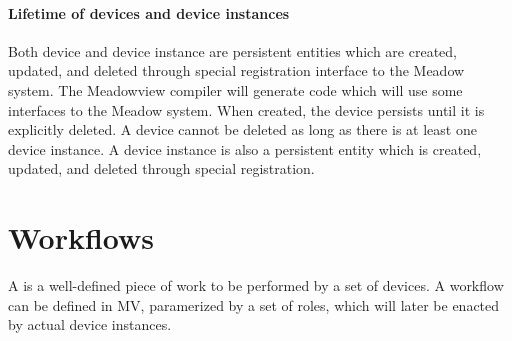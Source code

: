 \documentclass{myproc}
\begin{document}
\paragraph{Lifetime of devices and device instances}
Both device and device instance are persistent entities which are created,
updated, and deleted through special registration interface to the Meadow
system. The Meadowview compiler will generate code which will use some
interfaces to the Meadow system.
When created, the device persists until it is explicitly deleted. 
A device cannot be deleted as long as there is at least one device instance.
A device instance is also a persistent entity which is created, updated, and
deleted through special registration. 



\section{Workflows}
A  is a well-defined piece of work to be performed by a set of
devices. A workflow can be defined in MV, paramerized by a set of roles, which 
will later be enacted by actual device instances.
\end{document}
